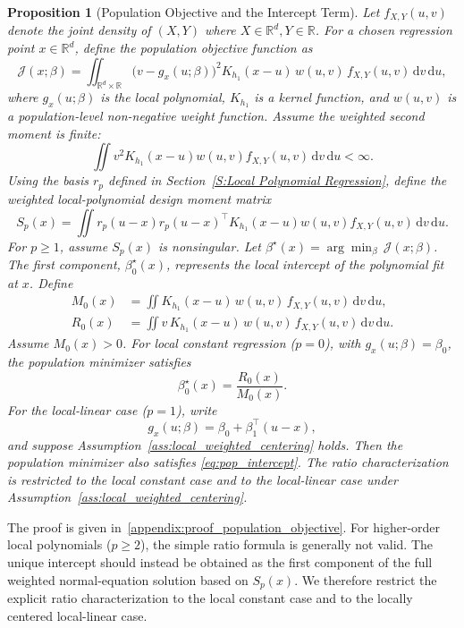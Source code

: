 \documentclass[preprint,1p,times,authoryear]{elsarticle}
\newtheorem{proposition}{Proposition}
\begin{document}
\begin{proposition}[Population Objective and the Intercept Term]
\label{prop:population_objective}
Let $f_{X,Y}(u,v)$ denote the joint density of $(X,Y)$ where $X \in \mathbb{R}^d, Y \in \mathbb{R}$. For a chosen regression point $x \in \mathbb{R}^d$, define the population objective function as
\[
\mathcal J(x;\beta)
=\iint_{\mathbb R^{d}\!\times\!\mathbb R}
\bigl(v-g_x(u;\beta)\bigr)^{2}
K_{h_1}(x-u)\,
w(u,v)\,
f_{X,Y}(u,v)\,\mathrm d v\,\mathrm d u,
\]
where $g_x(u;\beta)$ is the local polynomial, $K_{h_1}$ is a kernel function, and $w(u,v)$ is a population-level non-negative weight function. Assume the weighted second moment is finite:
\[
\iint v^2K_{h_1}(x-u)w(u,v)f_{X,Y}(u,v)\,\mathrm d v\,\mathrm d u<\infty.
\]
Using the basis \(r_p\) defined in Section~\ref{S:Local Polynomial Regression}, define the weighted local-polynomial design moment matrix
\[
S_p(x)=
\iint r_p(u-x)r_p(u-x)^\top
K_{h_1}(x-u)w(u,v)f_{X,Y}(u,v)\,\mathrm d v\,\mathrm d u.
\]
For \(p\ge1\), assume \(S_p(x)\) is nonsingular.
Let $\beta^{\star}(x)=\arg\!\min_{\beta}\,\mathcal J(x;\beta)$. The first component, $\beta^{\star}_0(x)$, represents the local intercept of the polynomial fit at $x$. Define
\begin{align}
M_0(x)
&=\iint
K_{h_1}(x-u)\,
w(u,v)\,
f_{X,Y}(u,v)\,\mathrm d v\,\mathrm d u, \label{eq:M0}\\
R_0(x)
&=\iint v\,
K_{h_1}(x-u)\,
w(u,v)\,
f_{X,Y}(u,v)\,\mathrm d v\,\mathrm d u. \label{eq:R0}
\end{align}
Assume $M_0(x)>0$.
For local constant regression ($p=0$), with $g_x(u;\beta)=\beta_0$, the population minimizer satisfies
\begin{equation}
\beta^{\star}_0(x)=\frac{R_0(x)}{M_0(x)}. \label{eq:pop_intercept}
\end{equation}
For the local-linear case ($p=1$), write
\[
g_x(u;\beta)=\beta_0+\beta_1^\top(u-x),
\]
and suppose Assumption~\ref{ass:local_weighted_centering} holds. Then the population minimizer also satisfies \eqref{eq:pop_intercept}. The ratio characterization is restricted to the local constant case and to the local-linear case under Assumption~\ref{ass:local_weighted_centering}.
\end{proposition}
The proof is given in~\ref{appendix:proof_population_objective}. For higher-order local polynomials ($p \ge 2$), the simple ratio formula is generally not valid. The unique intercept should instead be obtained as the first component of the full weighted normal-equation solution based on \(S_p(x)\). We therefore restrict the explicit ratio characterization to the local constant case and to the locally centered local-linear case.
\end{document}
